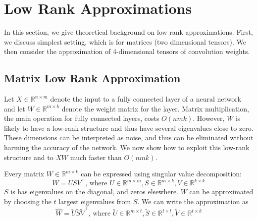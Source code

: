\documentclass{article}
\begin{document}
 




\begin{abstract}

\end{abstract}

\section{Low Rank Approximations}
In this section, we give theoretical background on low rank approximations. First, we discuss simplest setting, which is
for matrices (two dimensional tensors). We then consider the approximation of 4-dimensional tensors of convolution weights.


\subsection{Matrix Low Rank Approximation}
Let $X \in \mathbb{R}^{n \times m}$ denote the input to a fully connected layer of a neural network and let $W \in \mathbb{R}^{m \times k}$ denote the weight matrix for the layer. Matrix multiplication,  the main operation for fully connected layers, costs $O(nmk)$. However, $W$ is likely to have a low-rank structure and thus have several eigenvalues close to zero. These dimensions can be interpreted as noise, and thus can be eliminated without harming the accuracy of the network. We now show how to exploit this low-rank structure and to $XW$ much faster than $O(nmk)$. 


Every matrix $W \in \mathbb{R}^{m \times k}$ can be expressed using singular value decomposition:
\begin{equation*}
	W = USV^{\top}\text{, where }U \in \mathbb{R}^{m \times m}, S \in \mathbb{R}^{m \times k}, V \in \mathbb{R}^{k \times k}
\end{equation*}
$S$ is has eigenvalues on the diagonal, and zeros elsewhere. $W$ can be approximated by choosing the $t$ largest 
eigenvalues from $S$. We can write the approximation as
\begin{equation*}
	\hat{W} = \tilde{U}\tilde{S}\tilde{V}^{\top}\text{, where }\tilde{U} \in \mathbb{R}^{m \times t}, \tilde{S} \in \mathbb{R}^{t \times t}, \tilde{V} \in \mathbb{R}^{t \times k}
\end{equation*}
\end{document}
